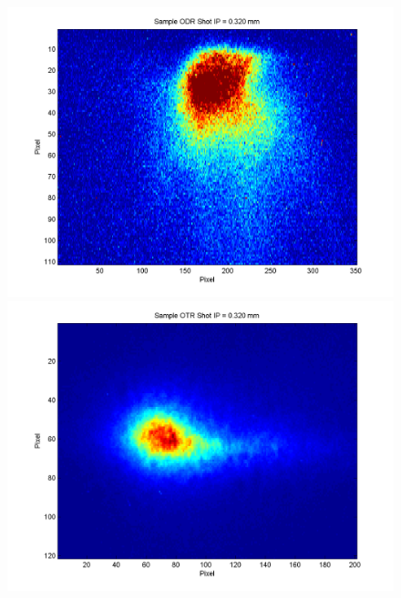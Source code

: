 \documentclass[12pt]{article}
\begin{document}
\begin{figure}
\begin{center}
\includegraphics[scale=0.5]{Figures/Sample_ODR_320.PNG}
\includegraphics[scale=0.5]{Figures/Sample_OTR_320.PNG}
\caption{}
\end{center}
\end{figure}
\end{document}
